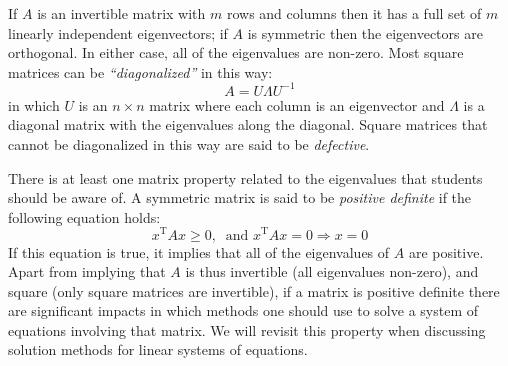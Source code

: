 \begin{enumerate}
If $A$ is an invertible matrix with $m$ rows and columns then it has a full set of $m$ linearly independent eigenvectors; if $A$ is symmetric then the eigenvectors are orthogonal. In either case, all of the eigenvalues are non-zero.  Most square matrices can be \emph{``diagonalized''} in this way:
\begin{equation*}
A = U \Lambda U^{-1}
\end{equation*}
in which $U$ is an $n\times n$ matrix where each column is an eigenvector and $\Lambda$ is a diagonal matrix with the eigenvalues along the diagonal.  Square matrices that cannot be diagonalized in this way are said to be \emph{defective}.  

\noindent There is at least one matrix property related to the eigenvalues that students should be aware of. A symmetric matrix is said to be \emph{positive definite} if the following equation holds:
\begin{equation*}
x^{\text{T}}Ax \ge 0, \ \text{ and } x^{\text{T}}Ax = 0 \Rightarrow x=0
\end{equation*}
If this equation is true, it implies that all of the eigenvalues of $A$ are positive.  Apart from implying that $A$ is thus invertible (all eigenvalues non-zero), and square (only square matrices are invertible), if a matrix is positive definite there are significant impacts in which methods one should use to solve a system of equations involving that matrix.  We will revisit this property when discussing solution methods for linear systems of equations.


\end{enumerate}
